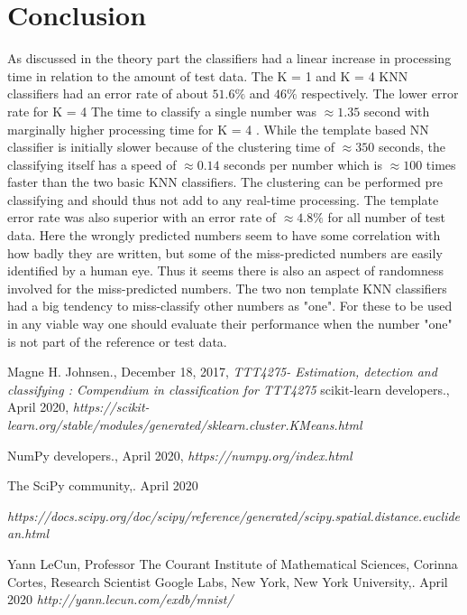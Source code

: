 \documentclass{article}
\begin{document}
\section{Conclusion}
As discussed in the theory part the classifiers had a linear increase in processing time in relation to the amount of test data. The K = 1 and K = 4 KNN classifiers had an error rate of about $51.6\%$ and $46\%$ respectively. The lower error rate for K = 4  The time to classify a single number was $\approx 1.35$ second with marginally higher processing time for K = 4 .
While the template based NN classifier is initially slower because of the clustering time of $\approx 350$ seconds, the classifying itself has a speed of $\approx 0.14$ seconds per number which is $\approx 100$ times faster than the two basic KNN classifiers. The clustering can be performed pre classifying and should thus not add to any real-time processing. The template error rate was also superior with an error rate of $\approx 4.8\%$ for all number of test data. Here the wrongly predicted numbers seem to have some correlation with how badly they are written, but some of the miss-predicted numbers are easily identified by a human eye. Thus it seems there is also an aspect of randomness involved for the miss-predicted numbers.
The two non template KNN classifiers had a big tendency to miss-classify other numbers as "one". For these to be used in any viable way one should evaluate their performance when the number "one" is not part of the reference or test data.

\begin{thebibliography}{99}

  Magne H. Johnsen., December 18, 2017, \emph{TTT4275- Estimation, detection and classifying
: Compendium in classification for TTT4275}
scikit-learn developers., April 2020, \emph{https://scikit-learn.org/stable/modules/generated/sklearn.cluster.KMeans.html}

NumPy developers., April 2020, \emph{https://numpy.org/index.html}

The SciPy community,. April 2020

\emph{https://docs.scipy.org/doc/scipy/reference/generated/scipy.spatial.distance.euclidean.html}

Yann LeCun, Professor
The Courant Institute of Mathematical Sciences, Corinna Cortes, Research Scientist
Google Labs, New York,
New York University,. April 2020
\emph{http://yann.lecun.com/exdb/mnist/}
\end{thebibliography}
\end{document}
